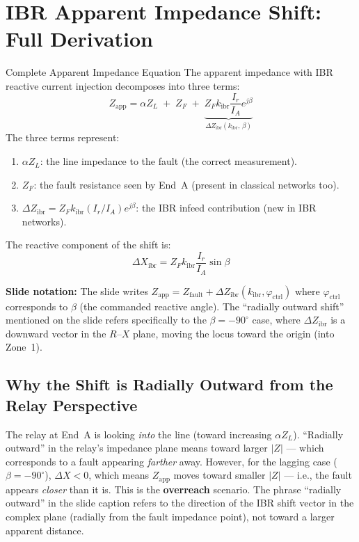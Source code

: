 \documentclass[12pt,a4paper]{article}
\newcommand{\kibr}{k_\mathrm{ibr}}
\newcommand{\Zapp}{Z_\mathrm{app}}
\newcommand{\DZibr}{\Delta Z_\mathrm{ibr}}
\begin{document}
\section{IBR Apparent Impedance Shift: Full Derivation}

\begin{formulabox}{Complete Apparent Impedance Equation}
The apparent impedance with IBR reactive current injection decomposes into three terms:
\begin{equation}
  \Zapp = \alpha Z_L \;+\; Z_F \;+\; \underbrace{Z_F \kibr \frac{I_r}{I_A} e^{j\beta}}_{\DZibr(\kibr,\,\beta)}
  \label{eq:zapp_full}
\end{equation}
The three terms represent:
\begin{enumerate}[nosep]
  \item $\alpha Z_L$: the line impedance to the fault (the correct measurement).
  \item $Z_F$: the fault resistance seen by End~A (present in classical networks too).
  \item $\DZibr = Z_F \kibr (I_r/I_A) e^{j\beta}$: the IBR infeed contribution (new in IBR networks).
\end{enumerate}

The reactive component of the shift is:
\begin{equation}
  \Delta X_\mathrm{ibr} = Z_F \kibr \frac{I_r}{I_A} \sin\beta
  \label{eq:dx_ibr}
\end{equation}

\textbf{Slide notation:} The slide writes $Z_\mathrm{app} = Z_\mathrm{fault} + \DZibr(\kibr, \varphi_\mathrm{ctrl})$ where $\varphi_\mathrm{ctrl}$ corresponds to $\beta$ (the commanded reactive angle). The ``radially outward shift'' mentioned on the slide refers specifically to the $\beta = -90^\circ$ case, where $\DZibr$ is a downward vector in the $R$--$X$ plane, moving the locus toward the origin (into Zone~1).
\end{formulabox}

\subsection{Why the Shift is Radially Outward from the Relay Perspective}

The relay at End~A is looking \emph{into} the line (toward increasing $\alpha Z_L$). ``Radially outward'' in the relay's impedance plane means toward larger $|Z|$ --- which corresponds to a fault appearing \emph{farther} away. However, for the lagging case ($\beta = -90^\circ$), $\Delta X < 0$, which means $\Zapp$ moves toward smaller $|Z|$ --- i.e., the fault appears \emph{closer} than it is. This is the \textbf{overreach} scenario. The phrase ``radially outward'' in the slide caption refers to the direction of the IBR shift vector in the complex plane (radially from the fault impedance point), not toward a larger apparent distance.
\end{document}

